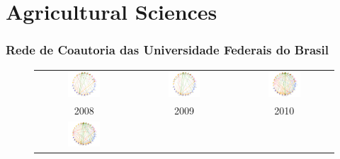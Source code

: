 
\section{\textbf{Agricultural Sciences}}

\subsubsection{Rede de Coautoria das Universidade Federais do Brasil}

\begin{figure}[H]
	\begin{tabular}{ccc}
		\includegraphics[width=0.35\textwidth]{Imagens/rede-agr-br-2008.pdf} &   \includegraphics[width=0.35\textwidth]{Imagens/rede-agr-br-2009.pdf} &
		\includegraphics[width=0.35\textwidth]{Imagens/rede-agr-br-2010.pdf}\\
		2008 & 2009 & 2010\\[6pt] 
		\includegraphics[width=0.35\textwidth]{Imagens/rede-agr-br-2011.pdf} &

\end{tabular}
\end{figure}
